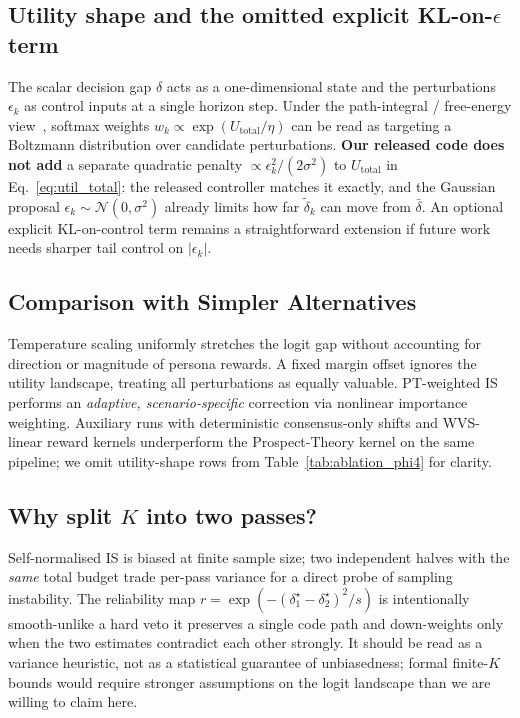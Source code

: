\documentclass{article}
\begin{document}
\subsection{Utility shape and the omitted explicit KL-on-\texorpdfstring{$\epsilon$}{epsilon} term}

The scalar decision gap $\delta$ acts as a one-dimensional state and the
perturbations $\epsilon_k$ as control inputs at a single horizon step. Under
the path-integral / free-energy view~\citep{williams2017mppi}, softmax
weights $w_k \propto \exp(U_{\text{total}}/\eta)$ can be read as targeting a
Boltzmann distribution over candidate perturbations. \textbf{Our released code
does not add} a separate quadratic penalty
$\propto \epsilon_k^2/(2\sigma^2)$ to $U_{\text{total}}$ in
Eq.~\ref{eq:util_total}: the released controller matches it exactly, and
the Gaussian proposal $\epsilon_k\sim\mathcal{N}(0,\sigma^2)$ already limits
how far $\tilde{\delta}_k$ can move from $\bar{\delta}$. An optional explicit
KL-on-control term remains a straightforward extension if future work needs
sharper tail control on $|\epsilon_k|$.

\subsection{Comparison with Simpler Alternatives}

Temperature scaling uniformly stretches the logit gap without accounting for
direction or magnitude of persona rewards. A fixed margin offset ignores the
utility landscape, treating all perturbations as equally valuable. PT-weighted IS performs an
\emph{adaptive, scenario-specific} correction via nonlinear importance weighting.
Auxiliary runs with deterministic consensus-only shifts and WVS-linear reward kernels
underperform the Prospect-Theory kernel on the same pipeline; we omit utility-shape
rows from Table~\ref{tab:ablation_phi4} for clarity.

\subsection{Why split \texorpdfstring{$K$}{K} into two passes?}

Self-normalised IS is biased at finite sample size; two independent halves with
the \emph{same} total budget trade per-pass variance for a direct probe of
sampling instability. The reliability map $r=\exp(-(\delta^\star_1-\delta^\star_2)^2/s)$
is intentionally smooth-unlike a hard veto it preserves a single code path and
down-weights only when the two estimates contradict each other strongly. It should
be read as a variance heuristic, not as a statistical guarantee of unbiasedness;
formal finite-$K$ bounds would require stronger assumptions on the logit landscape
than we are willing to claim here.
\end{document}

